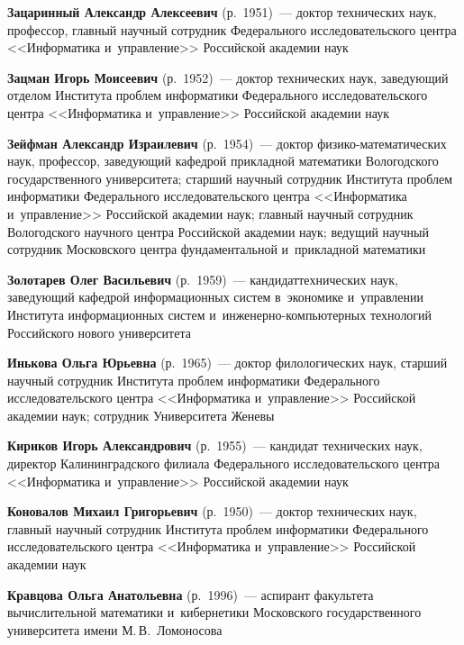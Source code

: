 \begin{multicols}{2}
\noindent
\textbf{Зацаринный Александр Алексеевич} (р.\ 1951)~--- 
доктор технических наук, профессор, главный научный сотрудник Федерального исследовательского цент\-ра 
<<Информатика и~управ\-ле\-ние>> Российской академии наук

\noindent
\textbf{Зацман Игорь Моисеевич} (р.\ 1952)~--- 
доктор технических наук, за\-ве\-ду\-ющий отделом Института проб\-лем 
информатики Федерального исследовательского цент\-ра <<Информатика и~управ\-ле\-ние>>
 \mbox{Российской} академии наук
 
\noindent
\textbf{Зейфман Александр Израилевич} (р.\ 1954)~--- доктор фи\-зи\-ко-ма\-те\-ма\-ти\-че\-ских наук, 
профессор, за\-ве\-ду\-ющий ка\-фед\-рой при\-клад\-ной математики Вологодского государственного 
университета; старший научный сотрудник Института проб\-лем информатики Федерального исследовательского 
цент\-ра <<Информатика и~управ\-ле\-ние>> Российской академии наук;
 главный научный сотрудник Вологодского научного цент\-ра Российской академии наук;
ведущий научный сотрудник  Московского центра фундаментальной и~прикладной математики
 
\noindent 
\textbf{Золотарев Олег Васильевич} (р.\ 1959)~--- 
кандидат\linebreak технических наук, за\-ве\-ду\-ющий ка\-фед\-рой информационных сис\-тем 
в~экономике и~управ\-ле\-нии Института информационных сис\-тем 
и~ин\-же\-нер\-но-компью\-тер\-ных технологий Российского нового университета
 
\noindent
\textbf{Инькова Ольга Юрьевна} (р.\ 1965)~--- 
доктор филологических наук, старший научный сотрудник Института проб\-лем информатики Федерального 
исследовательского цент\-ра <<Информатика и~управ\-ле\-ние>>
 Российской академии наук;
  сотрудник Университета Женевы
  
  \noindent
\textbf{Кириков Игорь Александрович} (р.\ 1955)~--- 
кандидат технических наук, директор Калининградского филиала Федерального исследовательского цент\-ра 
<<Информатика и~управ\-ле\-ние>> Российской академии наук
  
\noindent
\textbf{Коновалов Михаил Григорьевич} (р.\ 1950)~--- 
доктор технических наук, главный научный сотрудник Института проб\-лем информатики
 Федерального исследовательского цент\-ра <<Информатика и~управ\-ле\-ние>> Российской академии наук

\noindent
\textbf{Кравцова Ольга Анатольевна} (р.\ 1996)~--- 
аспирант факультета вы\-чис\-ли\-тель\-ной математики и~ки\-бер\-не\-ти\-ки 
Мос\-ков\-ско\-го государственного университета имени М.\,В.~Ломоносова



\end{multicols}
